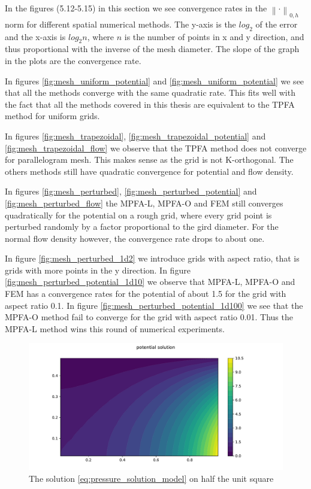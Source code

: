 \documentclass[../Main/main.tex]{subfiles}
\begin{document}
		\par 
		In the figures (5.12-5.15) in this section we see convergence rates in the $\left \| \cdot \right \|_{0,h}$ norm for different spatial numerical methods. The y-axis is the $log_2$ of the error and the x-axis is $log_2n$, where $n$ is the number of points in x and y direction, and thus proportional with the inverse of the mesh diameter. The slope of the graph in the plots are the convergence rate.
		\par
		In figures \ref{fig:mesh_uniform_potential} and \ref{fig:mesh_uniform_potential} we see that all the methods converge with the same quadratic rate. This fits well with the fact that all the methods covered in this thesis are equivalent to the TPFA method for uniform grids.
		\par
		In figures \ref{fig:mesh_trapezoidal}, \ref{fig:mesh_trapezoidal_potential} and \ref{fig:mesh_trapezoidal_flow} we observe that the TPFA method does not converge for parallelogram mesh. This makes sense as the grid is not K-orthogonal. The others methods still have quadratic convergence for potential and flow density.
		\par
		In figures \ref{fig:mesh_perturbed}, \ref{fig:mesh_perturbed_potential} and \ref{fig:mesh_perturbed_flow} the MPFA-L, MPFA-O and FEM still converges quadratically for the potential on a rough grid, where every grid point is perturbed randomly by a factor proportional to the gird diameter. For the normal flow density however, the convergence rate drops to about one.
		\par 
		In figure \ref{fig:mesh_perturbed_1d2} we introduce grids with aspect ratio, that is grids with more points in the y direction.
		In figure \ref{fig:mesh_perturbed_potential_1d10} we observe that MPFA-L, MPFA-O and FEM has a convergence rates for the potential of about 1.5 for the grid with aspect ratio 0.1. In figure \ref{fig:mesh_perturbed_potential_1d100} we see that the MPFA-O method fail to converge for the grid with aspect ratio 0.01. Thus the MPFA-L method wins this round of numerical experiments.
		\begin{figure}[h]
			\centering
			\includegraphics[width=1\textwidth]{Potential.pdf}
			\caption{The solution \eqref{eq:pressure_solution_model} on half the unit square }
			\label{fig:solution}
		\end{figure}
\end{document}

